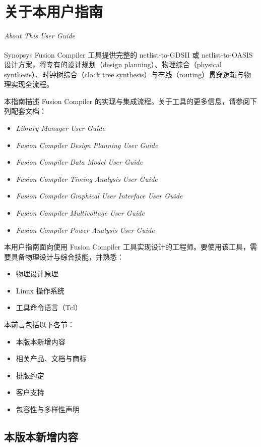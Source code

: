 \chapter*{关于本用户指南}

\noindent\textit{About This User Guide}

Synopsys Fusion Compiler 工具提供完整的 netlist-to-GDSII 或 netlist-to-OASIS\textsuperscript{\textregistered} 设计方案，将专有的设计规划（design planning）、物理综合（physical synthesis）、时钟树综合（clock tree synthesis）与布线（routing）贯穿逻辑与物理实现全流程。

本指南描述 Fusion Compiler 的实现与集成流程。关于工具的更多信息，请参阅下列配套文档：
\begin{itemize}
  \item \textit{Library Manager User Guide}
  \item \textit{Fusion Compiler Design Planning User Guide}
  \item \textit{Fusion Compiler Data Model User Guide}
  \item \textit{Fusion Compiler Timing Analysis User Guide}
  \item \textit{Fusion Compiler Graphical User Interface User Guide}
  \item \textit{Fusion Compiler Multivoltage User Guide}
  \item \textit{Fusion Compiler Power Analysis User Guide}
\end{itemize}

本用户指南面向使用 Fusion Compiler 工具实现设计的工程师。要使用该工具，需要具备物理设计与综合技能，并熟悉：
\begin{itemize}
  \item 物理设计原理
  \item Linux 操作系统
  \item 工具命令语言（Tcl）
\end{itemize}

本前言包括以下各节：
\begin{itemize}
  \item 本版本新增内容
  \item 相关产品、文档与商标
  \item 排版约定
  \item 客户支持
  \item 包容性与多样性声明
\end{itemize}

\section*{本版本新增内容}

